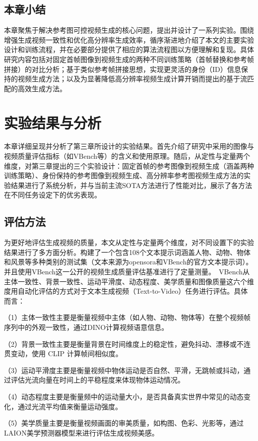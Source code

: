 \subsection{本章小结}
本章聚焦于解决参考图可控视频生成的核心问题，提出并设计了一系列实验。围绕增强生成视频一致性和优化高分辨率生成效率，循序渐进地介绍了本文的主要实验设计和训练流程，并在必要部分提供了相应的算法流程图以方便理解和复现。具体研究内容包括对固定首帧图像到视频生成的两种不同训练策略（首帧替换和参考帧拼接）的对比分析；基于类似参考帧拼接思想，实现更灵活的身份（ID）信息保持的视频生成方法；以及为显著降低高分辨率视频生成计算开销而提出的基于流匹配的高效生成方法。

\cleardoublepage
\section{实验结果与分析}
本章详细呈现并分析了第三章所设计的实验结果。首先介绍了研究中采用的图像与视频质量评估指标（如VBench等）的含义和使用原理。随后，从定性与定量两个维度，对第三章提出的三个实验设计：固定首帧的参考图像到视频生成（涵盖两种训练策略）、身份保持的参考图像到视频生成、高分辨率参考图视频生成方法的实验结果进行了系统分析，并与当前主流SOTA方法进行了性能对比，展示了各方法在不同任务设定下的优劣表现。
\subsection{评估方法}

为更好地评估生成视频的质量，本文从定性与定量两个维度，对不同设置下的实验结果进行了多方面分析。构建了一个包含108个文本提示词涵盖人物、动物、物体和风景等多种类别的测试集（文本来源为opensora和VBench的官方文本提示词）。并且使用VBench这一公开的视频生成质量评估基准进行了定量测量。\
VBench从主体一致性、背景一致性、运动平滑度、动态程度、美学质量和图像质量这六个维度用自动化评估的方式对于文本生成视频（Text-to-Video）任务进行评估。具体而言：

（1）主体一致性主要是衡量视频中主体（如人物、动物、物体等）在整个视频帧序列中的外观一致性，通过DINO计算视频语意信息。

（2）背景一致性主要是衡量背景在时间维度上的稳定性，避免抖动、漂移或不连贯变动，使用 CLIP 计算帧间相似度。

（3）运动平滑度主要是衡量视频中物体运动是否自然、平滑，无跳帧或抖动，通过评估光流向量在时间上的平稳程度来体现物体运动情况。

（4）动态程度主要是衡量频中的运动量大小，是否具备真实世界中常见的动态变化，通过光流平均值来衡量运动强度。

（5）美学质量主要是衡量视频画面的审美质量，如构图、色彩、光影等，通过LAION美学预测器模型来进行评估生成视频美感。


